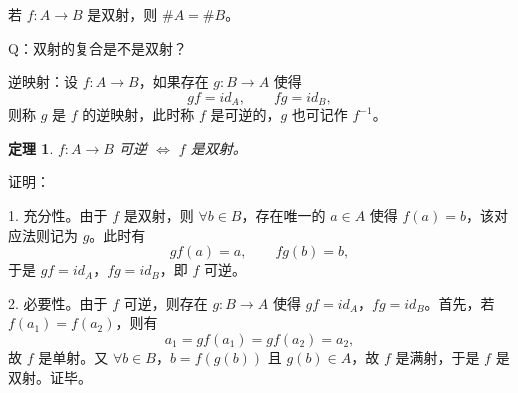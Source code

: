 \documentclass[UTF8,11pt]{ctexart}
\theoremstyle{cnthm}
\newtheorem{thm}{定理}[section]
\begin{document}
若 $f:A\to B$ 是双射，则 $\#A=\#B$。

Q：双射的复合是不是双射？

逆映射：设 $f:A\to B$，如果存在 $g:B\to A$ 使得
\[
gf=id_A,\qquad fg=id_B,
\]
则称 $g$ 是 $f$ 的逆映射，此时称 $f$ 是可逆的，$g$ 也可记作 $f^{-1}$。

\begin{thm}
$f:A\to B$ 可逆 $\iff$ $f$ 是双射。
\end{thm}

证明：

1. 充分性。由于 $f$ 是双射，则 $\forall b\in B$，存在唯一的 $a\in A$ 使得 $f(a)=b$，该对应法则记为 $g$。此时有
\[
gf(a)=a,\qquad fg(b)=b,
\]
于是 $gf=id_A$，$fg=id_B$，即 $f$ 可逆。

2. 必要性。由于 $f$ 可逆，则存在 $g:B\to A$ 使得 $gf=id_A$，$fg=id_B$。首先，若 $f(a_1)=f(a_2)$，则有
\[
a_1=gf(a_1)=gf(a_2)=a_2,
\]
故 $f$ 是单射。又 $\forall b\in B$，$b=f(g(b))$ 且 $g(b)\in A$，故 $f$ 是满射，于是 $f$ 是双射。证毕。
\end{document}
